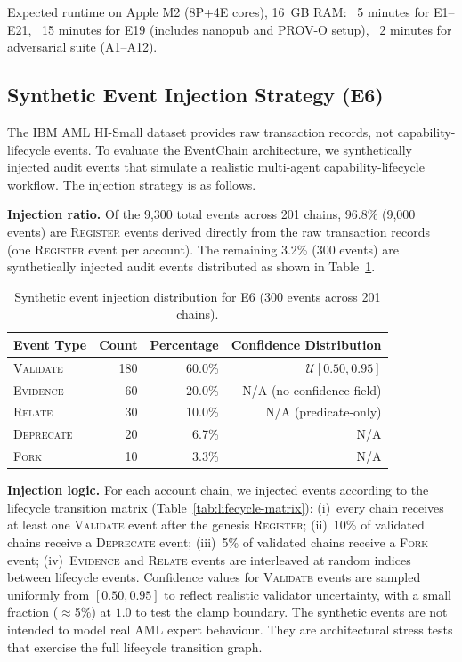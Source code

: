 Expected runtime on Apple M2 (8P+4E cores), 16~GB RAM: ~5 minutes for E1--E21, ~15 minutes for E19 (includes nanopub and PROV-O setup), ~2 minutes for adversarial suite (A1--A12).

\subsection{Synthetic Event Injection Strategy (E6)}

The IBM AML HI-Small dataset provides raw transaction records, not capability-lifecycle events. To evaluate the EventChain architecture, we synthetically injected audit events that simulate a realistic multi-agent capability-lifecycle workflow. The injection strategy is as follows.

\textbf{Injection ratio.} Of the 9,300 total events across 201 chains, 96.8\% (9,000 events) are \textsc{Register} events derived directly from the raw transaction records (one \textsc{Register} event per account). The remaining 3.2\% (300 events) are synthetically injected audit events distributed as shown in Table~\ref{tab:synthetic-events}.

\begin{table}[htbp]
\centering
\small
\caption{Synthetic event injection distribution for E6 (300 events across 201 chains).}
\label{tab:synthetic-events}
\begin{tabular}{@{}lrrr@{}}
\toprule
\textbf{Event Type} & \textbf{Count} & \textbf{Percentage} & \textbf{Confidence Distribution} \\
\midrule
\textsc{Validate} & 180 & 60.0\% & $\mathcal{U}[0.50, 0.95]$ \\
\textsc{Evidence} & 60 & 20.0\% & N/A (no confidence field) \\
\textsc{Relate} & 30 & 10.0\% & N/A (predicate-only) \\
\textsc{Deprecate} & 20 & 6.7\% & N/A \\
\textsc{Fork} & 10 & 3.3\% & N/A \\
\bottomrule
\end{tabular}
\end{table}

\textbf{Injection logic.} For each account chain, we injected events according to the lifecycle transition matrix (Table~\ref{tab:lifecycle-matrix}): (i)~every chain receives at least one \textsc{Validate} event after the genesis \textsc{Register}; (ii)~10\% of validated chains receive a \textsc{Deprecate} event; (iii)~5\% of validated chains receive a \textsc{Fork} event; (iv)~\textsc{Evidence} and \textsc{Relate} events are interleaved at random indices between lifecycle events. Confidence values for \textsc{Validate} events are sampled uniformly from $[0.50, 0.95]$ to reflect realistic validator uncertainty, with a small fraction ($\approx$5\%) at $1.0$ to test the clamp boundary. The synthetic events are not intended to model real AML expert behaviour. They are architectural stress tests that exercise the full lifecycle transition graph.

